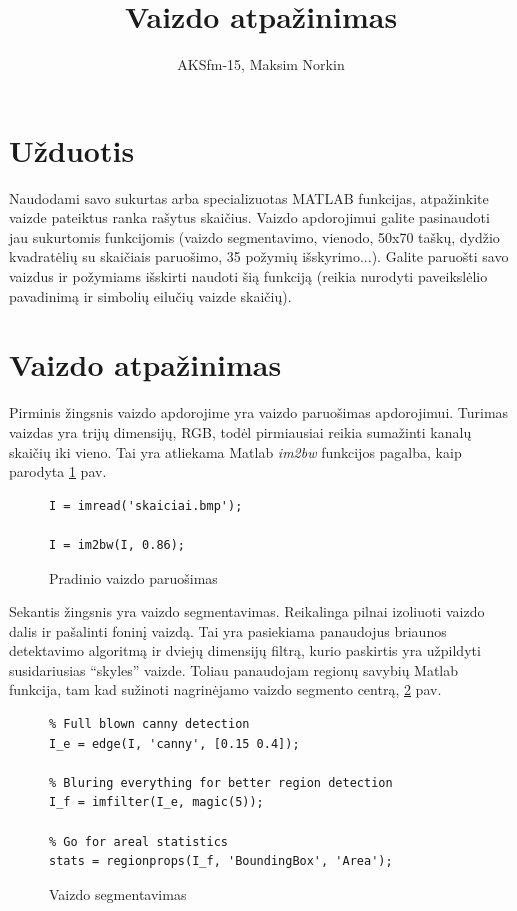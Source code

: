 \documentclass[11pt, a4paper, lithuanian]{article}
\author{AKSfm-15, Maksim Norkin}
\title{Vaizdo atpažinimas}
\begin{document}
    \maketitle

    \section{Užduotis}

    Naudodami savo sukurtas arba specializuotas MATLAB funkcijas, atpažinkite vaizde pateiktus ranka rašytus skaičius. Vaizdo apdorojimui galite pasinaudoti jau sukurtomis funkcijomis (vaizdo segmentavimo, vienodo, 50x70 taškų, dydžio kvadratėlių su skaičiais paruošimo, 35 požymių išskyrimo...). Galite paruošti savo vaizdus ir požymiams išskirti naudoti šią funkciją (reikia nurodyti paveikslėlio pavadinimą ir simbolių eilučių vaizde skaičių).

    \section{Vaizdo atpažinimas}

    Pirminis žingsnis vaizdo apdorojime yra vaizdo paruošimas apdorojimui. Turimas vaizdas yra trijų dimensijų, RGB, todėl pirmiausiai reikia sumažinti kanalų skaičių iki vieno. Tai yra atliekama Matlab \textit{im2bw} funkcijos pagalba, kaip parodyta \ref{code:pradinio_vaizdo_paruosimas} pav.

    \begin{figure}[h]
      \centering
      \caption{Pradinio vaizdo paruošimas}
      \label{code:pradinio_vaizdo_paruosimas}
      \begin{lstlisting}
I = imread('skaiciai.bmp');

I = im2bw(I, 0.86);
      \end{lstlisting}
    \end{figure}

    Sekantis žingsnis yra vaizdo segmentavimas. Reikalinga pilnai izoliuoti vaizdo dalis ir pašalinti foninį vaizdą. Tai yra pasiekiama panaudojus briaunos detektavimo algoritmą ir dviejų dimensijų filtrą, kurio paskirtis yra užpildyti susidariusias ``skyles'' vaizde. Toliau panaudojam regionų savybių Matlab funkcija, tam kad sužinoti nagrinėjamo vaizdo segmento centrą, \ref{code:vaizdo_segmentavimas} pav.

    \begin{figure}[h]
      \centering
      \caption{Vaizdo segmentavimas}
      \label{code:vaizdo_segmentavimas}
      \begin{lstlisting}
% Full blown canny detection
I_e = edge(I, 'canny', [0.15 0.4]);

% Bluring everything for better region detection
I_f = imfilter(I_e, magic(5));

% Go for areal statistics
stats = regionprops(I_f, 'BoundingBox', 'Area');
      \end{lstlisting}
    \end{figure}
\end{document}
